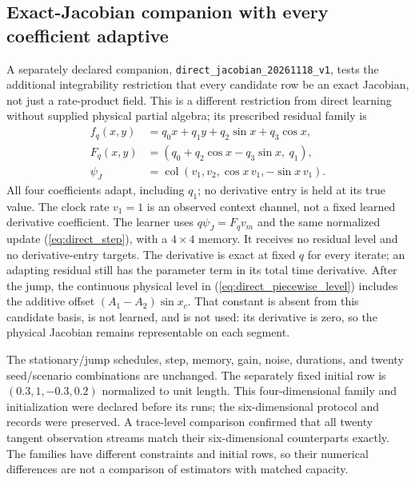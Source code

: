 \documentclass[journal]{IEEEtran}
\newcommand{\col}{\operatorname{col}}
\begin{document}
\subsection{Exact-Jacobian companion with every coefficient adaptive}
\label{sec:direct_jacobian_companion}
A separately declared companion, \texttt{direct\_jacobian\_20261118\_v1},
tests the additional integrability restriction that every candidate row be
an exact Jacobian, not just a rate-product field. This is a different
restriction from direct learning without supplied physical partial algebra;
its prescribed residual family is
\begin{align}
 f_q(x,y)&=q_0x+q_1y+q_2\sin x+q_3\cos x,\\
 F_q(x,y)&=(q_0+q_2\cos x-q_3\sin x,\ q_1),
 \label{eq:direct_jacobian_family}\\
 \psi_J&=\col(v_1,v_2,\cos x\,v_1,-\sin x\,v_1).
\end{align}
All four coefficients adapt, including $q_1$; no derivative entry is
held at its true value. The clock rate $v_1=1$ is an observed context
channel, not a fixed learned derivative coefficient. The learner uses
$q\psi_J=F_qv_m$ and the same normalized update
(\ref{eq:direct_step}), with a $4\times4$ memory. It receives no residual
level and no derivative-entry targets. The derivative is exact at fixed
$q$ for every iterate; an adapting residual still has the parameter term
in its total time derivative.
After the jump, the continuous physical level in
(\ref{eq:direct_piecewise_level}) includes the additive offset
$(A_1-A_2)\sin x_c$. That constant is absent from this candidate basis,
is not learned, and is not used: its derivative is zero, so the physical
Jacobian remains representable on each segment.

The stationary/jump schedules, step, memory, gain, noise, durations, and
twenty seed/scenario combinations are unchanged. The separately fixed
initial row is $(0.3,1,-0.3,0.2)$ normalized to unit length. This
four-dimensional family and initialization were declared before its runs;
the six-dimensional protocol and records were preserved. A trace-level
comparison confirmed that all twenty tangent observation streams match
their six-dimensional counterparts exactly. The families have different
constraints and initial rows, so their numerical differences are not a
comparison of estimators with matched capacity.
\end{document}
